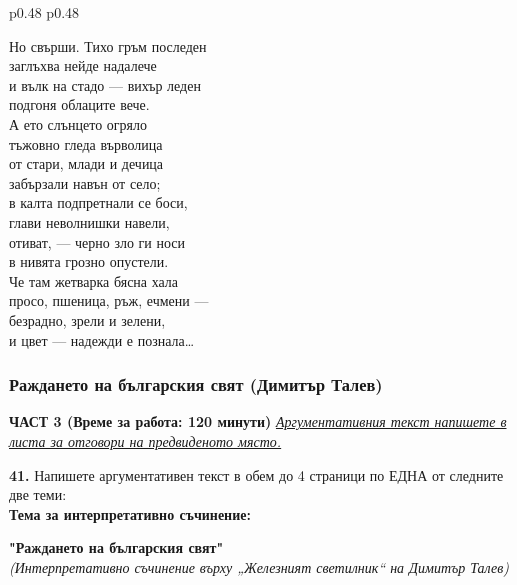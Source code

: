 \documentclass[12pt,a4paper]{article}
\begin{document}
\begin{tabular}{p{0.48\textwidth} p{0.48\textwidth}}
\begin{minipage}[t]{\linewidth}
Но свърши. Тихо гръм последен\\
заглъхва нейде надалече\\
и вълк на стадо — вихър леден\\
подгоня облаците вече.\\
А ето слънцето огряло\\
тъжовно гледа върволица\\
от стари, млади и дечица\\
забързали навън от село;\\
в калта подпретнали се боси,\\
глави неволнишки навели,\\
отиват, — черно зло ги носи\\
в нивята грозно опустели.\\
Че там жетварка бясна хала\\
просо, пшеница, ръж, ечмени —\\
безрадно, зрели и зелени,\\
и цвет — надежди е познала…\\
\end{minipage}
\end{tabular}

\subsubsection{Раждането на българския свят (Димитър Талев)}
\vspace{0.5cm}
\begin{center}
\textbf{ЧАСТ 3 (Време за работа: 120 минути)}
\vspace{0.2cm}
{\textit{\underline{Аргументативния текст напишете в листа за отговори на предвиденото място.}}}
\vspace{0.1cm}
\end{center}
\textbf{41.} Напишете аргументативен текст в обем до 4 страници по ЕДНА от следните две теми:
\\
\vspace{0.2cm}
\textbf{Тема за интерпретативно съчинение:}
\vspace{0.1cm}
\begin{center}
\textbf{"Раждането на българския свят"}
\\
\textit{(Интерпретативно съчинение върху „Железният светилник“ на Димитър Талев)}
\end{center}
\end{document}
